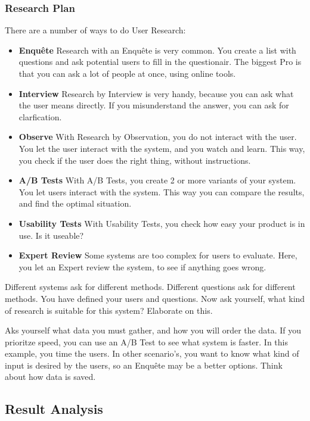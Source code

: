 \documentclass[10pt]{report}
\begin{document}
\subsubsection{Research Plan}

There are a number of ways to do User Research:

\begin{itemize}
	\item \textbf{Enquête} Research with an Enquête is very common. You create a list with questions and ask potential users to fill in the questionair. The biggest Pro is that you can ask a lot of people at once, using online tools.
	\item \textbf{Interview} Research by Interview is very handy, because you can ask what the user means directly. If you misunderstand the answer, you can ask for clarfication.
	\item \textbf{Observe} With Research by Observation, you do not interact with the user. You let the user interact with the system, and you watch and learn. This way, you check if the user does the right thing, without instructions.
	\item \textbf{A/B Tests} With A/B Tests, you create 2 or more variants of your system. You let users interact with the system. This way you can compare the results, and find the optimal situation.
	\item \textbf{Usability Tests} With Usability Tests, you check how easy your product is in use. Is it useable?
	\item \textbf{Expert Review} Some systems are too complex for users to evaluate. Here, you let an Expert review the system, to see if anything goes wrong.
\end{itemize}

\noindent Different systems ask for different methods. Different questions ask for different methods. You have defined your users and questions. Now ask yourself, what kind of research is suitable for this system? Elaborate on this.

Aks yourself what data you must gather, and how you will order the data. If you prioritze speed, you can use an A/B Test to see what system is faster. In this example, you time the users. In other scenario's, you want to know what kind of input is desired by the users, so an Enquête may be a better options. Think about how data is saved.

\subsection{Result Analysis}
\end{document}
